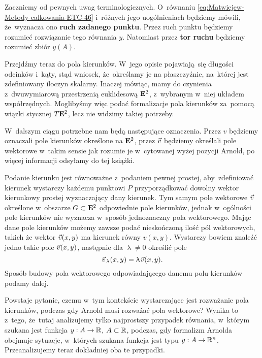 \documentclass[a4paper,11pt]{article}
\numberwithin{equation}{section}
\renewcommand{\lambda}{\uplambda}
\begin{document}
Zaczniemy od pewnych uwag terminologicznych. O~równaniu
\eqref{eq:Matwiejew-Metody-calkowania-ETC-46} i~różnych jego
uogólnieniach będziemy mówili, że~wyznacza ono
\textbf{ruch zadanego punktu}. Przez ruch punktu będziemy rozumieć
rozwiązanie tego równania $y$. Natomiast przez \textbf{tor ruchu} będziemy
rozumieć zbiór $y( A )$.

Przejdźmy teraz do pola kierunków. W~jego opisie pojawiają~się długości
odcinków i~kąty, stąd wniosek, że~określamy je na płaszczyźnie, na~której
jest zdefiniowany iloczyn skalarny. Inaczej mówiąc, mamy do czynienia
z~dwuwymiarową
przestrzenią euklidesową $\mathbf{E}^{ 2 }$, z~wybranym w~niej układem
współrzędnych. Moglibyśmy więc podać formalizacje pola kierunków za~pomocą
wiązki stycznej $T \mathbf{E}^{ 2 }$, lecz nie widzimy takiej potrzeby.

W~dalszym ciągu potrzebne nam będą następujące oznaczenia. Przez $v$
będziemy oznaczali pole kierunków określone na $\mathbf{E}^{ 2 }$, przez
$\vec{v}$ będziemy określali pole wektorowe w~takim sensie jak rozumie je
w~cytowanej wyżej pozycji Arnold, po więcej informacji odsyłamy do tej
książki.

Podanie kierunku jest równoważne z~podaniem pewnej prostej, aby~zdefiniować
kierunek wystarczy każdemu punktowi $P$ przyporządkować dowolny wektor
kierunkowy prostej wyznaczający dany kierunek. Tym samym pole wektorowe
$\vec{v}$ określone w~obszarze $G \subset \mathbf{E}^{ 2 }$ odpowiednie pole kierunków,
jednak w~ogólności pole kierunków nie wyznacza w~sposób jednoznaczny pola
wektorowego. Mając dane pole kierunków możemy zawsze podać nieskończoną
ilość pól wektorowych, takich że wektor $\vec{v}( x, y )$ ma kierunek równy
$v( x, y )$. Wystarczy bowiem znaleźć jedno takie pole $\vec{v}( x, y )$,
następnie dla $\lambda \neq 0$ określić pole
\begin{equation}
  \label{eq:Matwiejew-Metody-calkowania-ETC-47}
  \vecv_{ \, \lambda }( x, y ) = \lambda \HorSpaceThree \vecv( x, y ).
\end{equation}
Sposób budowy pola wektorowego odpowiadającego danemu polu kierunków podamy
dalej.

Powstaje pytanie, czemu w~tym kontekście wystarczające jest rozważanie pola
kierunków, podczas gdy Arnold musi rozważać pola wektorowe? Wynika to
z~tego, że~tutaj analizujemy tylko najprostszy przypadek równania, w~którym
szukana jest funkcja $y : A \to \mathbb{R}$, $A \subset \mathbb{R}$, podczas, gdy formalizm
Arnolda obejmuje sytuacje, w~których szukana funkcja jest typu
$y : A \to \mathbb{R}^{ n }$. Przeanalizujemy teraz dokładniej oba te przypadki.
\end{document}
